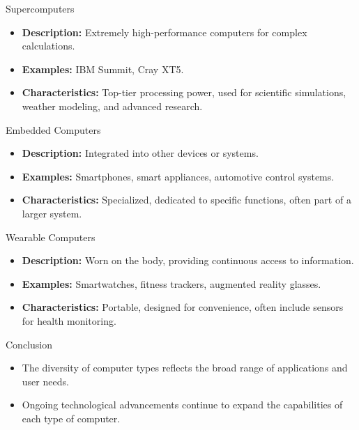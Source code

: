 \begin{frame}{Supercomputers}
  \begin{itemize}
    \item \textbf{Description:} Extremely high-performance computers for complex calculations.
    \item \textbf{Examples:} IBM Summit, Cray XT5.
    \item \textbf{Characteristics:} Top-tier processing power, used for scientific simulations, weather modeling, and advanced research.
  \end{itemize}
\end{frame}

\begin{frame}{Embedded Computers}
  \begin{itemize}
    \item \textbf{Description:} Integrated into other devices or systems.
    \item \textbf{Examples:} Smartphones, smart appliances, automotive control systems.
    \item \textbf{Characteristics:} Specialized, dedicated to specific functions, often part of a larger system.
  \end{itemize}
\end{frame}

\begin{frame}{Wearable Computers}
  \begin{itemize}
    \item \textbf{Description:} Worn on the body, providing continuous access to information.
    \item \textbf{Examples:} Smartwatches, fitness trackers, augmented reality glasses.
    \item \textbf{Characteristics:} Portable, designed for convenience, often include sensors for health monitoring.
  \end{itemize}
\end{frame}

\begin{frame}{Conclusion}
  \begin{itemize}
    \item The diversity of computer types reflects the broad range of applications and user needs.
    \item Ongoing technological advancements continue to expand the capabilities of each type of computer.
  \end{itemize}
\end{frame}
